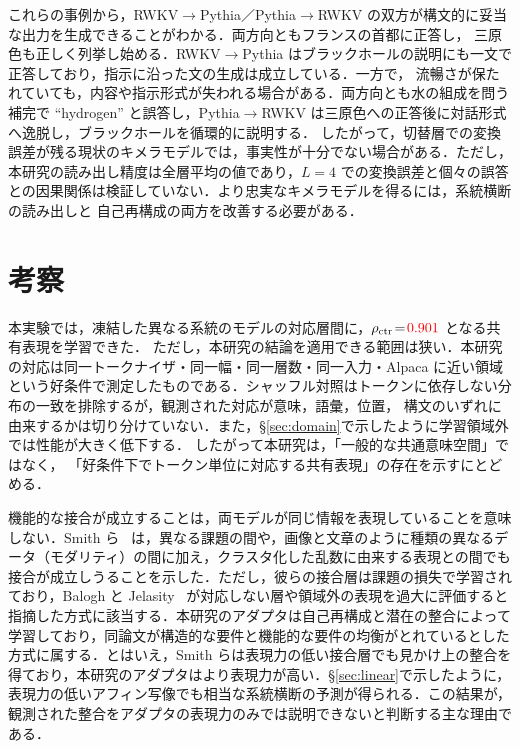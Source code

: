 \documentclass[techrep,noauthor]{ipsj}
\newcommand{\kw}[1]{#1}
\newcommand{\rev}[1]{{\color{blue}#1}}
\newcommand{\revr}[1]{{\color{red}#1}}
\newcommand{\revp}[1]{{\color{violet}#1}}
\newcommand{\RtoP}{\textsf{RWKV$\to$\allowbreak Pythia}}
\newcommand{\PtoR}{\textsf{Pythia$\to$\allowbreak RWKV}}
\begin{document}
これらの事例から，\kw{\RtoP{}／\PtoR{} の双方が構文的に妥当な出力を生成できる}ことがわかる．両方向ともフランスの首都に正答し，
三原色も正しく列挙し始める．\RtoP{} はブラックホールの説明にも一文で正答しており，指示に沿った文の生成は成立している．一方で，
\kw{流暢さが保たれていても，内容や指示形式が失われる場合がある}．両方向とも水の組成を問う補完で
``hydrogen'' と誤答し，\PtoR{} は三原色への正答後に対話形式へ逸脱し，ブラックホールを循環的に説明する．
\revp{したがって，切替層での変換誤差が残る現状のキメラモデルでは，事実性が十分でない場合がある．ただし，本研究の読み出し精度は全層平均の値であり，$L{=}4$ での変換誤差と個々の誤答との因果関係は検証していない．}より忠実なキメラモデルを得るには，\revp{系統横断の読み出し}と
\rev{自己再構成}の両方を改善する必要がある．

\section{考察}\label{sec:discussion}
本実験では，凍結した\revr{異なる系統}のモデルの対応層間に，$\rho_{\mathrm{ctr}}\!=\!\revr{0.901}$ となる共有表現を学習できた．
\kw{ただし，本研究の結論を適用できる範囲は狭い}．本研究の対応は同一トークナイザ・同一幅・同一層数・同一入力・Alpaca に近い領域
という好条件で測定したものである．シャッフル対照はトークンに依存しない分布の一致を排除するが，観測された対応が意味，語彙，位置，
構文のいずれに由来するかは切り分けていない．\rev{また，\S\revr{\ref{sec:domain}}で示したように学習領域外では性能が大きく低下する．}
したがって本研究は，「一般的な共通意味空間」ではなく，
「\revp{好条件下でトークン単位に対応する共有表現}」の存在を示すにとどめる．

機能的な接合が成立することは，両モデルが同じ情報を表現していることを意味しない．Smith ら~\cite{pmlr-v267-smith25a} は，異なる課題の間や\rev{，画像と文章のように種類の異なるデータ（モダリティ）}の間に加え，クラスタ化した乱数に由来する表現との間でも接合が成立しうることを示した．ただし，彼らの接合層は\rev{課題の損失}で学習されており，Balogh と Jelasity~\cite{balogh2025not} が対応しない層や領域外の表現を過大に評価すると指摘した方式に該当する．本研究のアダプタは\revp{自己再構成と潜在の整合}によって学習しており，同論文が構造的な要件と機能的な要件の均衡がとれているとした方式に属する．とはいえ，Smith らは\rev{表現力の低い}接合層でも見かけ上の整合を得ており，本研究のアダプタはより表現力が高い．\S\ref{sec:linear}で示したように，\rev{表現力の低い}アフィン写像でも相当な系統横断の予測が得られる．この結果が，観測された整合をアダプタの表現力のみでは説明できないと判断する主な理由である．
\end{document}
